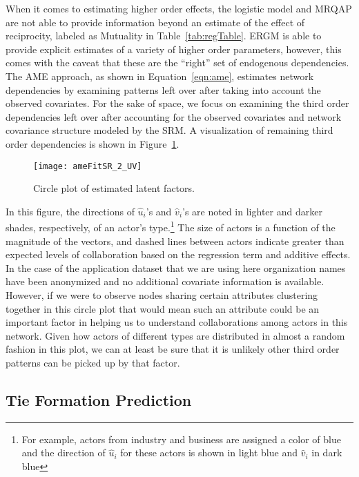 When it comes to estimating higher order effects, the logistic model and MRQAP are not able to provide information beyond an estimate of the effect of reciprocity, labeled as Mutuality in Table~\ref{tab:regTable}. ERGM is able to provide explicit estimates of a variety of higher order parameters, however, this comes with the caveat that these are the ``right'' set of endogenous dependencies. The AME approach, as shown in Equation~\ref{eqn:ame}, estimates network dependencies by examining patterns left over after taking into account the observed covariates. For the sake of space, we focus on examining the third order dependencies left over after accounting for the observed covariates and network covariance structure modeled by the SRM. A visualization of remaining third order dependencies is shown in Figure~\ref{fig:uv}. 

\begin{figure}[ht]
\centering
	\texttt{[image: ameFitSR\_2\_UV]}
	\caption{Circle plot of estimated latent factors.}
	\label{fig:uv}
\end{figure}
\FloatBarrier

In this figure, the directions of $\hat{u}_{i}$'s and $\hat{v}_{i}$'s are noted in lighter and darker shades, respectively, of an actor's type.\footnote{For example, actors from industry and business are assigned a color of blue and the direction of $\hat{u}_{i}$ for these actors is shown in light blue and $\hat{v}_{i}$ in dark blue} The size of actors is a function of the magnitude of the vectors, and dashed lines between actors indicate greater than expected levels of collaboration based on the regression term and additive effects. In the case of the application dataset that we are using here organization names have been anonymized and no additional covariate information is available. However, if we were to observe nodes sharing certain attributes clustering together in this circle plot that would mean such an attribute could be an important factor in helping us to understand collaborations among actors in this network. Given how actors of different types are distributed in almost a random fashion in this plot, we can at least be sure that it is unlikely other third order patterns can be picked up by that factor.

\subsection{Tie Formation Prediction}

